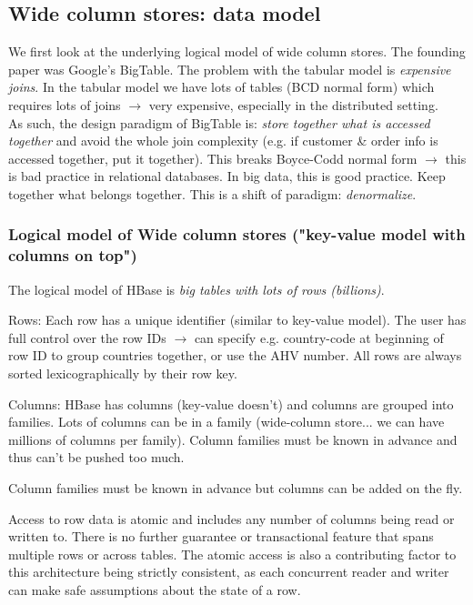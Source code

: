 \documentclass[11pt,oneside,a4paper]{article}
\begin{document}
\subsection{Wide column stores: data model}

We first look at the underlying logical model of wide column stores. The founding paper was Google's BigTable. The problem with the tabular model is \textit{expensive joins}. In the tabular model we have lots of tables (BCD normal form) which requires lots of joins $\rightarrow$ very expensive, especially in the distributed setting.\\
As such, the design paradigm of BigTable is: \textit{store together	what is	accessed together} and avoid the whole join complexity (e.g. if customer \& order info is accessed together, put it together). This breaks Boyce-Codd normal form $\rightarrow$ this is bad practice in relational databases. In big data, this is good practice. Keep together what belongs together. This is a shift of paradigm: \textit{denormalize}.

\subsubsection{Logical model of Wide column stores ("key-value model with columns on top")}

The logical model of HBase is \textit{big tables with lots of rows (billions)}. 

\begin{compactitem}
	\item Rows: Each row has a unique identifier (similar to key-value model). The user has full control over the row IDs $\rightarrow$ can specify e.g. country-code at beginning of row ID to group countries together, or use the AHV number. All rows are always sorted lexicographically by their row key.
	\item Columns: HBase has columns (key-value doesn't) and columns are grouped into families. Lots of columns can be in a family (wide-column store... we can have millions of columns per family). Column families must be known in advance and thus can't be pushed too much.
	\item Column families must be known in advance but columns can be added on the fly.
\end{compactitem}

Access to row data is atomic and includes any number of columns being read or written to. There is no further guarantee or transactional feature that spans multiple rows or across tables. The atomic access is also a contributing factor to this architecture being strictly consistent, as each concurrent reader and writer can make safe assumptions about the state of a row.
\end{document}

